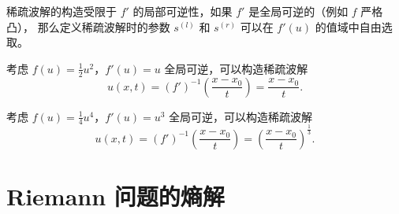 \begin{remark}
    稀疏波解的构造受限于 $f'$ 的局部可逆性，如果 $f'$ 是全局可逆的（例如 $f$ 严格凸），
    那么定义稀疏波解时的参数 $s^{(l)}$ 和 $s^{(r)}$ 可以在 $f'(u)$ 的值域中自由选取。
\end{remark}

\begin{example}
    考虑 $f(u) = \frac12 u^2$，$f'(u) = u$ 全局可逆，可以构造稀疏波解
    \[
        u(x,t) = (f')^{-1}\left(\frac{x-x_0}{t}\right) = \frac{x-x_0}{t}.
    \]
\end{example}

\begin{example}
    考虑 $f(u) = \frac14 u^4$，$f'(u) = u^3$ 全局可逆，可以构造稀疏波解
    \[
        u(x,t) = (f')^{-1}\left(\frac{x-x_0}{t}\right) = \left(\frac{x-x_0}{t}\right)^{\frac13}.
    \]
\end{example}

\section{Riemann 问题的熵解}

